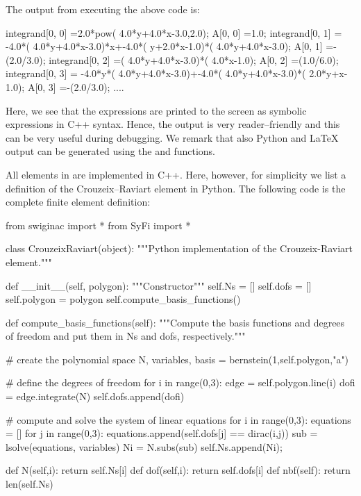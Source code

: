 \vspace*{2pt}


\noindent The output from executing the above code is:
\begin{c++}
integrand[0, 0]  =2.0*pow( 4.0*y+4.0*x-3.0,2.0);
A[0, 0]          =1.0;
integrand[0, 1]  = -4.0*( 4.0*y+4.0*x-3.0)*x+-4.0*( y+2.0*x-1.0)*( 4.0*y+4.0*x-3.0);
A[0, 1]          =-(2.0/3.0);
integrand[0, 2]  =( 4.0*y+4.0*x-3.0)*( 4.0*x-1.0);
A[0, 2]          =(1.0/6.0);
integrand[0, 3]  = -4.0*y*( 4.0*y+4.0*x-3.0)+-4.0*( 4.0*y+4.0*x-3.0)*( 2.0*y+x-1.0);
A[0, 3]          =-(2.0/3.0);
....
\end{c++}

\vspace*{2pt}

\noindent Here, we see that the expressions are printed to the screen as symbolic
expressions in C++ syntax. Hence, the output is very reader--friendly
and this can be very useful during debugging.  We remark that also
Python and LaTeX output can be generated using the 
and  functions.

All elements in \syfi{} are implemented in C++. Here, however, for
simplicity we list a definition of the Crouzeix--Raviart element in Python.
The following code is the complete finite element definition:
\begin{python}
from swiginac import *
from SyFi import *

class CrouzeixRaviart(object):
    """Python implementation of the Crouzeix-Raviart element."""

    def __init__(self, polygon):
        """Constructor"""
        self.Ns = []
        self.dofs = []
        self.polygon = polygon
        self.compute_basis_functions()

    def compute_basis_functions(self):
        """Compute the basis functions and degrees of freedom
        and put them in Ns and dofs, respectively."""

        # create the polynomial space
        N, variables, basis = bernstein(1,self.polygon,"a")

        # define the degrees of freedom
        for i in range(0,3):
            edge = self.polygon.line(i)
            dofi = edge.integrate(N)
            self.dofs.append(dofi)

        # compute and solve the system of linear equations
        for i in range(0,3):
            equations = []
                for j in range(0,3):
                    equations.append(self.dofs[j] == dirac(i,j))
                    sub = lsolve(equations, variables)
                    Ni = N.subs(sub)
                    self.Ns.append(Ni);

    def N(self,i): return self.Ns[i]
    def dof(self,i): return self.dofs[i]
    def nbf(self): return len(self.Ns)
\end{python}

